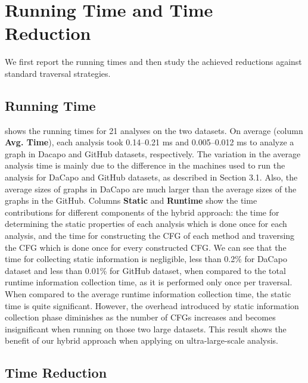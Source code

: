 \section{Running Time and Time Reduction}
\label{sec:performance-gain}

We first report the running times and then study the achieved reductions against standard traversal strategies. 

\subsection{Running Time}

 shows the running times for 21 analyses on the two 
datasets. On average (column \textbf{Avg. Time}), each analysis took 
0.14--0.21 ms and 0.005--0.012 ms to analyze a graph in Dacapo and GitHub 
datasets, respectively. The variation in the average analysis time is 
mainly due to the difference in the machines used to run the analysis for 
DaCapo and GitHub datasets, as described in Section 3.1. Also, the average 
sizes of graphs in DaCapo are much larger than the average sizes of the graphs in the GitHub.
%
Columns \textbf{Static} and \textbf{Runtime} show the time contributions for 
different components of the hybrid approach: the time for determining the 
static properties of each analysis which is done once for each analysis, and 
the time for constructing the CFG of each method and traversing the CFG which 
is done once for every constructed CFG. 
We can see that the time for collecting static information is negligible, 
less than 0.2\% for DaCapo dataset and less than 0.01\% for GitHub 
dataset, when compared to the total runtime information collection time, as it is performed only 
once per traversal. When compared to the average runtime information collection time, the static 
time is quite significant. However, the overhead introduced by static 
information collection phase diminishes as the number of CFGs increases and 
becomes insignificant when running on those two large datasets. This result 
shows the benefit of our hybrid approach when applying on ultra-large-scale
analysis.

\subsection{Time Reduction}


